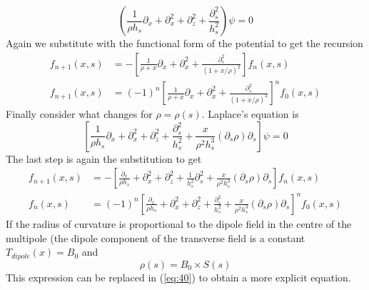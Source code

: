 	\begin{equation}
		\left( \frac{1}{\rho h_s} \partial_x + \partial_x^2 + \partial_z^2 + \frac{\partial_s^2}{h_s^2} \right) \psi = 0
	\end{equation}
Again we substitute with the functional form of the potential to get the recursion
	\begin{align}
		f_{n+1}(x,s) & = - \left[ \frac{1}{\rho + x} \partial_x + \partial_x^2 + \frac{\partial_s^2}{(1+x/ \rho)^2} \right] f_n(x,s) \\
		f_{n+1}(x,s) & = (-1)^n \left[ \frac{1}{\rho + x} \partial_x + \partial_x^2 + \frac{\partial_s^2}{(1+x/ \rho)^2} \right]^n f_0(x,s)
	\end{align}
Finally consider what changes for $\rho = \rho (s)$. Laplace's equation is
	\begin{equation}
		\left[ \frac{1}{\rho h_s} \partial_x + \partial_x^2 + \partial_z^2 + \frac{\partial_s^2}{h_s^2} + \frac{x}{\rho^2 h_s^3} (\partial_s \rho) \partial_s \right] \psi = 0
	\end{equation}	 	
The last step is again the substitution to get
	\begin{align}
		f_{n+1}(x,s) & = - \left[ \frac{\partial_x}{\rho h_s} + \partial_x^2 + \partial_z^2 + \frac{1}{h_s^2}\partial_s^2 + \frac{x}{\rho^2 h_s^3} (\partial_s \rho) \partial_s \right] f_n(x,s) \\
		f_{n}(x,s) & = (-1)^n \left[ \frac{\partial_x}{\rho h_s} + \partial_x^2 + \partial_z^2 + \frac{\partial_s^2}{h_s^2} + \frac{x}{\rho^2 h_s^3} (\partial_s \rho) \partial_s \right]^n f_0(x,s) \label{eq:40}
	\end{align}
If the radius of curvature is proportional to the dipole field in the centre of the multipole (the dipole component of the transverse field is a constant $T_{dipole}(x) = B_0$ and
	\begin{equation}
		\rho(s) = B_0 \times S(s)
	\end{equation}
This expression can be replaced in (\ref{eq:40}) to obtain a more explicit equation. 


